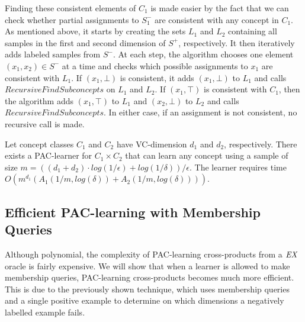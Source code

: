 Finding these consistent elements of $C_1$ is made easier by the fact that we can check whether partial assignments to $S^-_1$ are consistent with any concept in $C_1$. 
As mentioned above, it starts by creating the sets $L_1$ and $L_2$ containing all samples in the first and second dimension of $S^+$, respectively.
It then iteratively adds labeled samples from $S^-$.
At each step, the algorithm chooses one element $(x_1, x_2) \in S^-$ at a time and checks which possible assignments to $x_1$ are consistent with $L_1$.
If $(x_1, \bot)$ is consistent, it adds $(x_1, \bot)$ to $L_1$ and calls $RecursiveFindSubconcepts$ on $L_1$ and $L_2$.
If $(x_1, \top)$ is consistent with $C_1$, then the algorithm adds $(x_1, \top)$ to $L_1$ and $(x_2, \bot)$ to $L_2$ and calls $RecursiveFindSubconcepts$.
In either case, if an assignment is not consistent, no recursive call is made. 




\begin{theorem}
Let concept classes $C_1$ and $C_2$ have VC-dimension $d_1$ and $d_2$, respectively.
There exists a PAC-learner for $C_1 \times C_2$ that can learn any concept using a sample of size $m = ((d_1 + d_2) \cdot log(1/\epsilon) + log(1/\delta))/\epsilon$.
The learner requires time $O(m^{d_1}(A_1(1/m, log(\delta)) +  A_2(1/m, log(\delta))))$.
\end{theorem}


\iffalse
\subsection{Efficient PAC-learning with Membership Queries}

Although polynomial, the complexity of PAC-learning cross-products from a $\emph{EX}$ oracle is fairly expensive. 
We will show that when a learner is allowed to make membership queries, PAC-learning cross-products becomes much more efficient. 
This is due to the previously shown technique, which uses membership queries and a single positive example to determine on which dimensions a negatively labelled example fails. 

